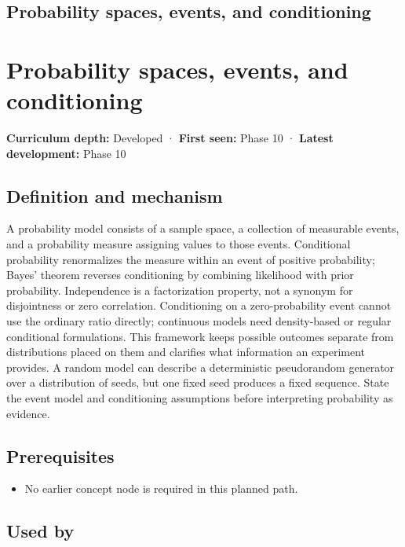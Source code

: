 \hypertarget{appendix-f1ef323f6ed7}{}
\section*{Probability spaces, events, and conditioning}
\chapter{Probability spaces, events, and conditioning}\label{appendix-f1ef323f6ed7-probability-spaces-events-and-conditioning}

\textbf{Curriculum depth:} Developed · \textbf{First seen:} Phase 10 · \textbf{Latest development:} Phase 10

\section{Definition and mechanism}\label{appendix-f1ef323f6ed7-definition-and-mechanism}

A probability model consists of a sample space, a collection of measurable events, and a probability measure assigning values to those events. Conditional probability renormalizes the measure within an event of positive probability; Bayes' theorem reverses conditioning by combining likelihood with prior probability. Independence is a factorization property, not a synonym for disjointness or zero correlation. Conditioning on a zero-probability event cannot use the ordinary ratio directly; continuous models need density-based or regular conditional formulations. This framework keeps possible outcomes separate from distributions placed on them and clarifies what information an experiment provides. A random model can describe a deterministic pseudorandom generator over a distribution of seeds, but one fixed seed produces a fixed sequence. State the event model and conditioning assumptions before interpreting probability as evidence.

\section{Prerequisites}\label{appendix-f1ef323f6ed7-prerequisites}

\begin{itemize}
\tightlist
\item
  No earlier concept node is required in this planned path.
\end{itemize}

\section{Used by}\label{appendix-f1ef323f6ed7-used-by}

